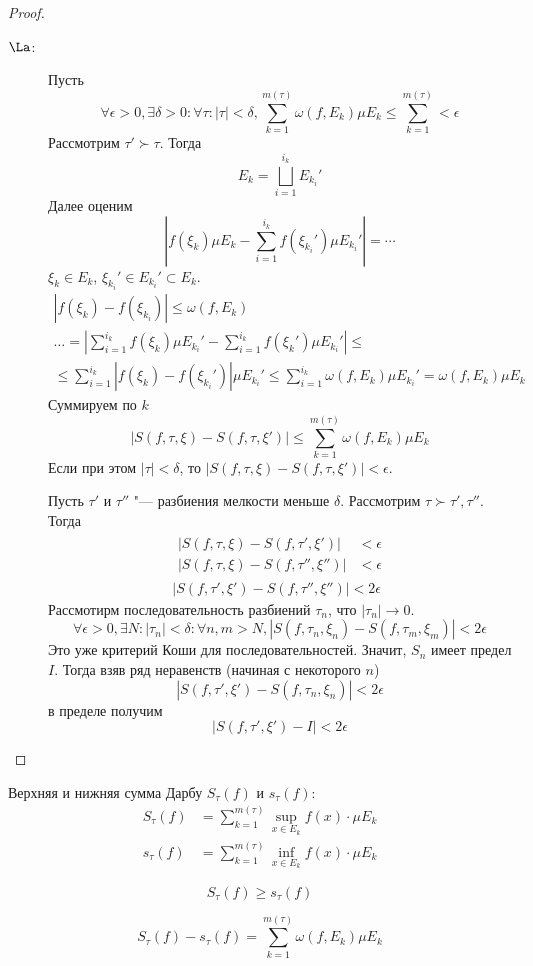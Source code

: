 \begin{proof}
\begin{description}
	\item[$\La$:]
		Пусть
		\[
			\forall \epsilon > 0, \exists \delta > 0\colon \forall \tau\colon |\tau| < \delta,
			\sum_{k=1}^{m(\tau)} \omega(f, E_k) \mu E_k \le \sum_{k=1}^{m(\tau)} < \epsilon
		\]
		Рассмотрим $\tau' \succ \tau$. Тогда
		\[ E_k = \bigsqcup_{i=1}^{i_k} E_{k_i}' \]
		Далее оценим
		\[
			\left| f(\xi_k) \mu E_k - \sum_{i=1}^{i_k} f\left(\xi_{k_i}'\right) \mu E_{k_i}' \right| = \cdots
		\]
		$\xi_k \in E_k$, $\xi_{k_i}' \in E_{k_i}' \subset E_k$.
		\begin{gather*}
			|f(\xi_k) - f\left(\xi_{k_i}\right)| \le \omega(f, E_k) \\
			\dots = \left| \sum_{i=1}^{i_k} f(\xi_k) \mu E_{k_i}' - \sum_{i=1}^{i_k} f(\xi_k') \mu E_{k_i}' \right| \le \\
			\le \sum_{i=1}^{i_k} \left| f(\xi_k) - f\left(\xi_{k_i}'\right) \right| \mu E_{k_i}' \le \sum_{i=1}^{i_k}  \omega(f, E_k) \mu E_{k_i}' = \omega(f, E_k) \mu E_k
		\end{gather*}
		Суммируем по $k$
		\[
			|S(f, \tau, \xi) - S(f, \tau, \xi')| \le \sum_{k=1}^{m(\tau)} \omega(f, E_k) \mu E_k
		\]
		Если при этом $|\tau| < \delta$, то $|S(f, \tau, \xi) - S(f, \tau, \xi')| < \epsilon$.

		Пусть $\tau'$ и $\tau''$ "--- разбиения мелкости меньше $\delta$.
		Рассмотрим $\tau \succ \tau', \tau''$. Тогда
		\begin{gather*}
			\begin{aligned}
				|S(f, \tau, \xi) - S(f, \tau' , \xi' )| &< \epsilon \\
				|S(f, \tau, \xi) - S(f, \tau'', \xi'')| &< \epsilon
			\end{aligned} \\
			|S(f, \tau', \xi') - S(f, \tau'', \xi'')| < 2\epsilon
		\end{gather*}
		Рассмотирм последовательность разбиений $\tau_n$, что $|\tau_n| \to 0$.
		\[ \forall \epsilon > 0, \exists N\colon |\tau_n| < \delta \colon \forall n,m > N, |S(f, \tau_n, \xi_n) - S(f, \tau_m, \xi_m)| < 2\epsilon \]
		Это уже критерий Коши для последовательностей.
		Значит, $S_n$ имеет предел $I$.
		Тогда взяв ряд неравенств (начиная с некоторого $n$)
		\[ | S(f, \tau', \xi') - S(f, \tau_n, \xi_n) | < 2\epsilon \]
		в пределе получим
		\[ | S(f, \tau', \xi') - I| < 2\epsilon \]
	\end{description}
\end{proof}

\begin{Def}
	Верхняя и нижняя сумма Дарбу $S_\tau(f)$ и $s_\tau(f)$:
	\begin{align*}
		S_\tau(f) &= \sum_{k=1}^{m(\tau)} \sup_{x \in E_k} f(x) \cdot \mu E_k \\
		s_\tau(f) &= \sum_{k=1}^{m(\tau)} \inf_{x \in E_k} f(x) \cdot \mu E_k
	\end{align*}
\end{Def}
\begin{Rem}
	\[ S_\tau(f) \ge s_\tau(f) \]
\end{Rem}
\begin{Rem}
	\[ S_\tau(f) - s_\tau(f) = \sum_{k=1}^{m(\tau)} \omega(f, E_k) \mu E_k \]
\end{Rem}

